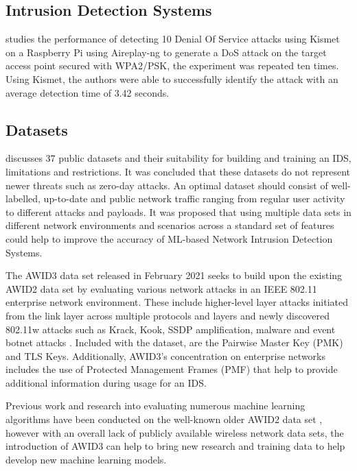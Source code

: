 \subsection{Intrusion Detection Systems}

\cite{10.4108/eai.27-11-2021.2315535} studies the performance of detecting 10 Denial Of Service attacks using Kismet on a Raspberry Pi using Aireplay-ng to generate a DoS attack on the target access point secured with WPA2/PSK, the experiment was repeated ten times. Using Kismet, the authors were able to successfully identify the attack with an average detection time of 3.42 seconds.

\subsection{Datasets}

\cite{9664737} discusses 37 public datasets and their suitability for building and training an IDS, limitations and restrictions. It was concluded that these datasets do not represent newer threats such as zero-day attacks. An optimal dataset should consist of well-labelled, up-to-date and public network traffic ranging from regular user activity to different attacks and payloads. It was proposed that using multiple data sets in different network environments and scenarios across a standard set of features could help to improve the accuracy of ML-based Network Intrusion Detection Systems.

\medskip

The AWID3 data set \parencite{9360747} released in February 2021 seeks to build upon the existing AWID2 data set by evaluating various network attacks in an IEEE 802.11 enterprise network environment. These include higher-level layer attacks initiated from the link layer across multiple protocols and layers and newly discovered 802.11w attacks such as Krack, Kook, SSDP amplification, malware and event botnet attacks \parencite{kolias2015intrusion}. Included with the dataset, are the Pairwise Master Key (PMK) and TLS Keys. Additionally, AWID3's concentration on enterprise networks includes the use of Protected Management Frames (PMF) that help to provide additional information during usage for an IDS. 

Previous work and research into evaluating numerous machine learning algorithms have been conducted on the well-known older AWID2 data set \parencite{kolias2015intrusion}, however with an overall lack of publicly available wireless network data sets, the introduction of AWID3 can help to bring new research and training data to help develop new machine learning models.  

